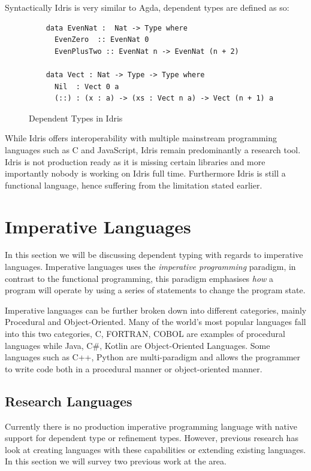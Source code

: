 \documentclass[a4paper,12pt]{report}
\begin{document}
\par
Syntactically Idris is very similar to Agda, dependent types are defined as so: 
\begin{figure}[H]
  \begin{lstlisting}      
    data EvenNat :  Nat -> Type where
      EvenZero  :: EvenNat 0
      EvenPlusTwo :: EvenNat n -> EvenNat (n + 2)
      
    data Vect : Nat -> Type -> Type where
      Nil  : Vect 0 a
      (::) : (x : a) -> (xs : Vect n a) -> Vect (n + 1) a
  \end{lstlisting}
  \caption{Dependent Types in Idris}
\end{figure}

\par
While Idris offers interoperability with multiple mainstream programming 
languages such as C and JavaScript, Idris remain predominantly a research tool. 
Idris is not production ready \cite{gpIdris} as it is missing certain libraries 
and more importantly nobody is working on Idris full time. Furthermore Idris is 
still a functional language, hence suffering from the limitation stated earlier. 

\section{Imperative Languages}

In this section we will be discussing dependent typing with regards to imperative 
languages. Imperative languages uses the \textit{imperative programming} 
\cite{imperativeOverview} paradigm, in contrast to the functional 
programming, this paradigm emphasises \textit{how} a program will operate 
by using a series of statements to change the program state.

\par

Imperative languages can be further broken down into different categories, 
mainly Procedural and Object-Oriented. Many of the world's most popular languages 
fall into this two categories, C, FORTRAN, COBOL are examples of procedural 
languages while Java, C#, Kotlin are Object-Oriented Languages. Some languages such 
as C++, Python are multi-paradigm and allows the programmer to write code both 
in a procedural manner or object-oriented manner. 

\subsection{Research Languages}
Currently there is no production imperative programming language with 
native support for dependent type or refinement types. 
However, previous research has look at creating languages with these 
capabilities or extending existing languages. In this section we will survey 
two previous work at the area. 
\end{document}
